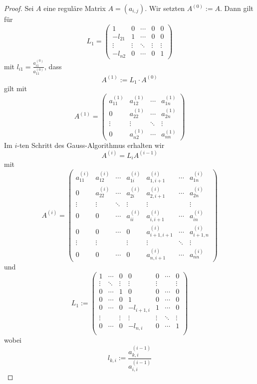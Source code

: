 \documentclass[smallheadings]{scrartcl}
\theoremstyle{definition}
\begin{document}
	\begin{proof}
	Sei $A$ eine reguläre Matrix $A=(a_{i,j})$. Wir setzten $A^{(0)}:=A$. Dann gilt für $$L_1=\begin{pmatrix}
	
	1&0&\cdots&0&0\\
	-l_{21}&1&\cdots&0&0\\
	\vdots&\vdots&\ddots&\vdots&\vdots\\
	-l_{n2}&0&\cdots&0&1

	\end{pmatrix}	
	$$ mit $l_{i1}=\frac{a_{i1}^{(0)}}{a_{11}^{(0)}}$, dass
$$A^{(1)}:=L_1\cdot A^{(0)}$$ gilt mit 
$$A^{(1)}=\begin{pmatrix}
a_{11}^{(1)}&a_{12}^{(1)}&\cdots &a_{1n}^{(1)}\\
0&a_{22}^{(1)}&\cdots &a_{2n}^{(1)}\\
\vdots&\vdots&\ddots&\vdots\\
0&a_{n2}^{(1)}&\cdots & a_{nn}^{(1)}
\end{pmatrix}
	$$
	Im $i$-ten Schritt des Gauss-Algorithmus erhalten wir
	$$ A^{(i)} = L_iA^{(i-1)}$$
	mit
	$$ A^{(i)}=\begin{pmatrix}
	a_{11}^{(i)}&a_{12}^{(i)}&\cdots&a_{1i}^{(i)}&a_{1,i+1}^{(i)}&\cdots&a_{1n}^{(i)}\\
	0&a_{22}^{(i)}&\cdots&a_{2i}^{(i)}&a_{2,i+1}^{(i)}&\cdots&a_{2n}^{(i)}\\
	\vdots&\vdots&\ddots&\vdots&\vdots&&\vdots\\
	0&0&\cdots&a_{ii}^{(i)}&a_{i,i+1}^{(i)}&\cdots&a_{in}^{(i)}\\
	0&0&\cdots&0&a_{i+1,i+1}^{(i)}&\cdots&a_{i+1,n}^{(i)}\\
	\vdots&\vdots&&\vdots&\vdots&\ddots&\vdots\\
	0&0&\cdots&0&a_{n,i+1}^{(i)}&\cdots&a_{nn}^{(i)}
	\end{pmatrix}
	$$
	und $$L_1:=\begin{pmatrix}
	1&\cdots&0&0&0&\cdots&0\\
	\vdots&\ddots&\vdots&\vdots&\vdots&&\vdots\\
	0&\cdots&1&0&0&\cdots&0\\
	0&\cdots&0&1&0&\cdots&0\\
	0&\cdots&0&-l_{i+1,i}&1&\cdots&0\\
	\vdots&&\vdots&\vdots&\vdots&\ddots&\vdots\\
	0&\cdots&0&-l_{n,i}&0&\cdots&1\\
	\end{pmatrix}
	$$wobei $$l_{k,i}:=\frac{a_{k,i}^{(i-1)}}{a_{i,i}^{(i-1)}}$$
$$
\end{proof}
\end{document}
